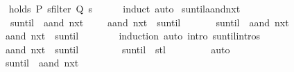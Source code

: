 \begin{isabellebody}
\ \isamarkupfalse%
\ {\isachardoublequoteopen}holds\ P\ {\isacharparenleft}sfilter\ Q\ s{\isacharparenright}{\isachardoublequoteclose}\isanewline
\ \ \ \ \isamarkupfalse%
\ induct\ auto\isanewline
{}\isamarkupfalse%
%
\endisatagproof
{\isafoldproof}%
%
\isadelimproof
\isanewline
%
\endisadelimproof
\isanewline
{}\isamarkupfalse%
\ suntil{\isacharunderscore}aand{\isacharunderscore}nxt{\isacharcolon}\isanewline
\ \ {\isachardoublequoteopen}{\isacharparenleft}{\isasymphi}\ suntil\ {\isacharparenleft}{\isasymphi}\ aand\ nxt\ {\isasympsi}{\isacharparenright}{\isacharparenright}\ {\isasymomega}\ {\isasymlongleftrightarrow}\ {\isacharparenleft}{\isasymphi}\ aand\ nxt\ {\isacharparenleft}{\isasymphi}\ suntil\ {\isasympsi}{\isacharparenright}{\isacharparenright}\ {\isasymomega}{\isachardoublequoteclose}\isanewline
%
\isadelimproof
%
\endisadelimproof
%
\isatagproof
{}\isamarkupfalse%
\isanewline
\ \ \isamarkupfalse%
\ {\isachardoublequoteopen}{\isacharparenleft}{\isasymphi}\ suntil\ {\isacharparenleft}{\isasymphi}\ aand\ nxt\ {\isasympsi}{\isacharparenright}{\isacharparenright}\ {\isasymomega}{\isachardoublequoteclose}\ \isamarkupfalse%
\ \isamarkupfalse%
\ {\isachardoublequoteopen}{\isacharparenleft}{\isasymphi}\ aand\ nxt\ {\isacharparenleft}{\isasymphi}\ suntil\ {\isasympsi}{\isacharparenright}{\isacharparenright}\ {\isasymomega}{\isachardoublequoteclose}\isanewline
\ \ \ \ \isamarkupfalse%
\ induction\ {\isacharparenleft}auto\ intro{\isacharcolon}\ suntil{\isachardot}intros{\isacharparenright}\isanewline
{}\isamarkupfalse%
\isanewline
\ \ \isamarkupfalse%
\ {\isachardoublequoteopen}{\isacharparenleft}{\isasymphi}\ aand\ nxt\ {\isacharparenleft}{\isasymphi}\ suntil\ {\isasympsi}{\isacharparenright}{\isacharparenright}\ {\isasymomega}{\isachardoublequoteclose}\isanewline
\ \ \isamarkupfalse%
\ \isamarkupfalse%
\ {\isachardoublequoteopen}{\isacharparenleft}{\isasymphi}\ suntil\ {\isasympsi}{\isacharparenright}\ {\isacharparenleft}stl\ {\isasymomega}{\isacharparenright}{\isachardoublequoteclose}\ {\isachardoublequoteopen}{\isasymphi}\ {\isasymomega}{\isachardoublequoteclose}\isanewline
\ \ \ \ \isamarkupfalse%
\ auto\isanewline
\ \ \isamarkupfalse%
\ \isamarkupfalse%
\ {\isachardoublequoteopen}{\isacharparenleft}{\isasymphi}\ suntil\ {\isacharparenleft}{\isasymphi}\ aand\ nxt\ {\isasympsi}{\isacharparenright}{\isacharparenright}\ {\isasymomega}{\isachardoublequoteclose}\isanewline

\end{isabellebody}

